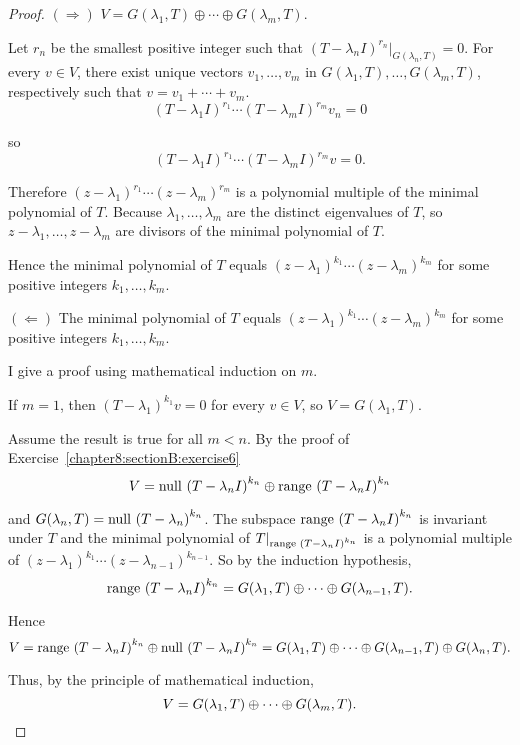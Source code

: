 \begin{proof}
    $(\Rightarrow)$ $V = G(\lambda_{1}, T)\oplus \cdots \oplus G(\lambda_{m}, T)$.

    Let $r_{n}$ be the smallest positive integer such that ${(T - \lambda_{n}I)}^{r_{n}}\vert_{G(\lambda_{n}, T)} = 0$. For every $v\in V$, there exist unique vectors $v_{1}, \ldots, v_{m}$ in $G(\lambda_{1}, T), \ldots, G(\lambda_{m}, T)$, respectively such that $v = v_{1} + \cdots + v_{m}$.
    \[
        {(T - \lambda_{1}I)}^{r_{1}}\cdots {(T - \lambda_{m}I)}^{r_{m}}v_{n} = 0
    \]

    so
    \[
        {(T - \lambda_{1}I)}^{r_{1}}\cdots {(T - \lambda_{m}I)}^{r_{m}}v = 0.
    \]

    Therefore ${(z - \lambda_{1})}^{r_{1}}\cdots {(z - \lambda_{m})}^{r_{m}}$ is a polynomial multiple of the minimal polynomial of $T$. Because $\lambda_{1}, \ldots, \lambda_{m}$ are the distinct eigenvalues of $T$, so $z - \lambda_{1}, \ldots, z - \lambda_{m}$ are divisors of the minimal polynomial of $T$.

    Hence the minimal polynomial of $T$ equals ${(z - \lambda_{1})}^{k_{1}}\cdots {(z - \lambda_{m})}^{k_{m}}$ for some positive integers $k_{1}, \ldots, k_{m}$.
    \bigskip

    $(\Leftarrow)$ The minimal polynomial of $T$ equals ${(z - \lambda_{1})}^{k_{1}}\cdots {(z - \lambda_{m})}^{k_{m}}$ for some positive integers $k_{1}, \ldots, k_{m}$.

    I give a proof using mathematical induction on $m$.

    If $m = 1$, then ${(T - \lambda_{1})}^{k_{1}}v = 0$ for every $v\in V$, so $V = G(\lambda_{1}, T)$.

    Assume the result is true for all $m < n$. By the proof of Exercise~\ref{chapter8:sectionB:exercise6}
    \[
        V = \operatorname{null}\,{{(T - \lambda_{n}I)}^{k_{n}}}\oplus\operatorname{range}\,{{(T - \lambda_{n}I)}^{k_{n}}}
    \]

    and $G(\lambda_{n}, T) = \operatorname{null}\,{{(T - \lambda_{n})}^{k_{n}}}$. The subspace $\operatorname{range}\,{{(T - \lambda_{n}I)}^{k_{n}}}$ is invariant under $T$ and the minimal polynomial of $T\vert_{\operatorname{range}\,{{(T - \lambda_{n}I)}^{k_{n}}}}$ is a polynomial multiple of ${(z - \lambda_{1})}^{k_{1}}\cdots {(z - \lambda_{n-1})}^{k_{n-1}}$. So by the induction hypothesis,
    \[
        \operatorname{range}\,{{(T - \lambda_{n}I)}^{k_{n}}} = G(\lambda_{1}, T)\oplus \cdots \oplus G(\lambda_{n-1}, T).
    \]

    Hence
    \[
        V = \operatorname{range}\,{{(T - \lambda_{n}I)}^{k_{n}}} \oplus \operatorname{null}\,{{(T - \lambda_{n}I)}^{k_{n}}} = G(\lambda_{1}, T)\oplus \cdots \oplus G(\lambda_{n-1}, T) \oplus G(\lambda_{n}, T).
    \]

    Thus, by the principle of mathematical induction,
    \[
        V = G(\lambda_{1}, T)\oplus \cdots \oplus G(\lambda_{m}, T).\qedhere
    \]
\end{proof}
\newpage

